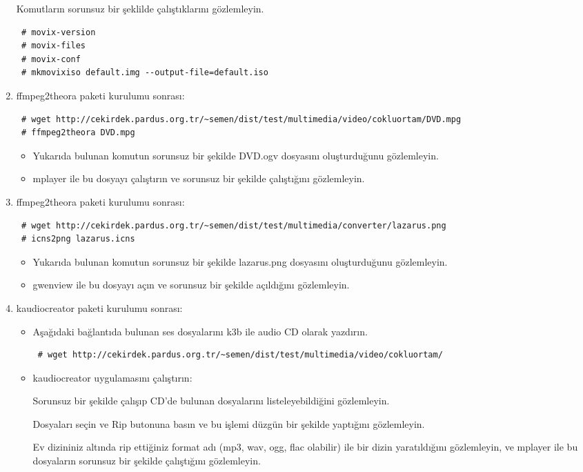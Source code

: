 \documentclass[a4paper,10pt]{article}
\begin{document}
\begin{enumerate}
Komutların sorunsuz bir şeklilde çalıştıklarını gözlemleyin.
\begin{verbatim}
 # movix-version
 # movix-files
 # movix-conf
 # mkmovixiso default.img --output-file=default.iso
\end{verbatim}

\item ffmpeg2theora paketi kurulumu sonrası:
\begin{verbatim}
 # wget http://cekirdek.pardus.org.tr/~semen/dist/test/multimedia/video/cokluortam/DVD.mpg
 # ffmpeg2theora DVD.mpg
\end{verbatim}
\begin{itemize}
 \item Yukarıda bulunan komutun sorunsuz bir şekilde DVD.ogv dosyasını oluşturduğunu gözlemleyin.
 \item mplayer ile bu dosyayı çalıştırın ve sorunsuz bir şekilde çalıştığını gözlemleyin.
\end{itemize}
\item ffmpeg2theora paketi kurulumu sonrası:
\begin{verbatim}
 # wget http://cekirdek.pardus.org.tr/~semen/dist/test/multimedia/converter/lazarus.png
 # icns2png lazarus.icns
\end{verbatim}
\begin{itemize}
 \item Yukarıda bulunan komutun sorunsuz bir şekilde lazarus.png dosyasını oluşturduğunu gözlemleyin.
 \item gwenview ile bu dosyayı açın ve sorunsuz bir şekilde açıldığını gözlemleyin.
\end{itemize}
\item kaudiocreator paketi kurulumu sonrası:
\begin{itemize}
 \item Aşağıdaki bağlantıda bulunan ses dosyalarını k3b ile audio CD olarak yazdırın.
\begin{verbatim}
 # wget http://cekirdek.pardus.org.tr/~semen/dist/test/multimedia/video/cokluortam/
\end{verbatim}
 \item kaudiocreator uygulamasını çalıştırın:

Sorunsuz bir şekilde çalışıp CD'de bulunan dosyalarını listeleyebildiğini gözlemleyin.

Dosyaları seçin ve Rip butonuna basın ve bu işlemi düzgün bir şekilde yaptığını gözlemleyin.

Ev dizininiz altında rip ettiğiniz format adı (mp3, wav, ogg, flac olabilir) ile bir dizin yaratıldığını gözlemleyin, ve mplayer ile bu dosyaların sorunsuz bir şekilde çalıştığını gözlemleyin.
\end{itemize}


\end{enumerate}
\end{document}
